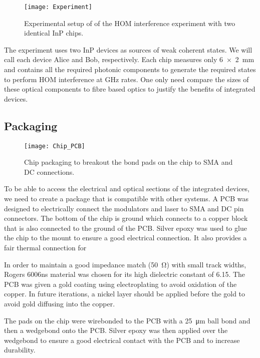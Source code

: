 \begin{figure}[tbp]
	\centering
	\texttt{[image: Experiment]}
	\caption[HOM experimental setup]{Experimental setup of of the \ac{HOM} interference experiment with two identical \ac{InP} chips.}
	\label{fig:hom_experiment}
\end{figure}

The experiment uses two \ac{InP} devices as sources of weak coherent states. We will call each device Alice and Bob, respectively. Each chip measures only \SI[product-units=power]{6x2}{mm} and contains all the required photonic components to generate the required states to perform \ac{HOM} interference at GHz rates. One only need compare the sizes of these optical components to fibre based optics to justify the benefits of integrated devices.

\subsection{Packaging}

\begin{figure}[tbp]
	\centering
	\texttt{[image: Chip\_PCB]}
	\caption[Chip package]{Chip packaging to breakout the bond pads on the chip to SMA and DC connections.}
	\label{fig:chip_pcb}
\end{figure}

To be able to access the electrical and optical sections of the integrated devices, we need to create a package that is compatible with other systems. A PCB was designed to electrically connect the modulators and laser to SMA and DC pin connectors. The bottom of the chip is ground which connects to a copper block that is also connected to the ground of the PCB. Silver epoxy was used to glue the chip to the mount to ensure a good electrical connection. It also provides a fair thermal connection for 

In order to maintain a good impedance match (\SI{50}{\ohm}) with small track widths, Rogers 6006ns material was chosen for its high dielectric constant of \num{6.15}. The PCB was given a gold coating using electroplating to avoid oxidation of the copper. In future iterations, a nickel layer should be applied before the gold to avoid gold diffusing into the copper. 

The pads on the chip were wirebonded to the PCB with a \SI{25}{\micro\meter} ball bond and then a wedgebond onto the PCB. Silver epoxy was then applied over the wedgebond to ensure a good electrical contact with the PCB and to increase durability. 

